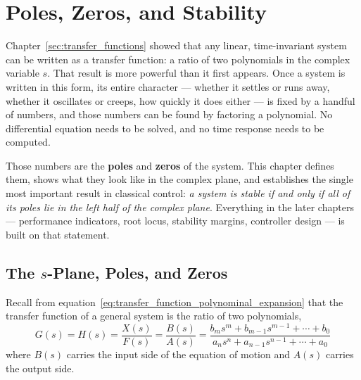 \documentclass[12pt,letter]{article}
\begin{document}
	\setcounter{section}{3}
	\setcounter{figure}{0}
	\renewcommand\thefigure{\thesection.\arabic{figure}}


\section{Poles, Zeros, and Stability}
\label{sec:poles_zeros_stability}

Chapter~\ref{sec:transfer_functions} showed that any linear, time-invariant system can be written as a transfer function: a ratio of two polynomials in the complex variable $s$. That result is more powerful than it first appears. Once a system is written in this form, its entire character --- whether it settles or runs away, whether it oscillates or creeps, how quickly it does either --- is fixed by a handful of numbers, and those numbers can be found by factoring a polynomial. No differential equation needs to be solved, and no time response needs to be computed.

Those numbers are the \textbf{poles} and \textbf{zeros} of the system. This chapter defines them, shows what they look like in the complex plane, and establishes the single most important result in classical control: \emph{a system is stable if and only if all of its poles lie in the left half of the complex plane}. Everything in the later chapters --- performance indicators, root locus, stability margins, controller design --- is built on that statement.


\subsection{The \texorpdfstring{$s$}{s}-Plane, Poles, and Zeros}
\label{sec:poles_and_zeros}

Recall from equation~\ref{eq:transfer_function_polynominal_expansion} that the transfer function of a general system is the ratio of two polynomials,
\begin{equation}
	G(s) = H(s) = \frac{X(s)}{F(s)} = \frac{B(s)}{A(s)} = \frac{b_ms^m+b_{m-1}s^{m-1} + \cdots + b_0}{a_ns^n+a_{n-1}s^{n-1} + \cdots + a_0}
	\label{eq:transfer_function_ratio}
\end{equation}
where $B(s)$ carries the input side of the equation of motion and $A(s)$ carries the output side.
\end{document}
